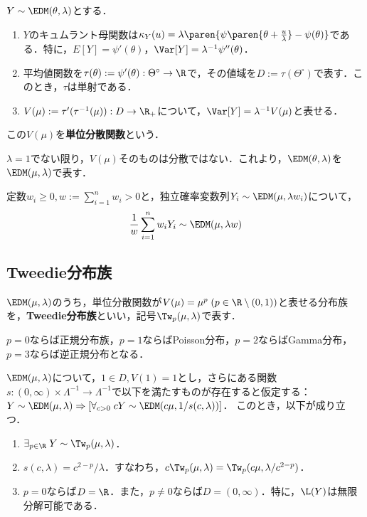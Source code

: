 \documentclass[uplatex,dvipdfmx]{jsreport}
\begin{document}
\begin{lemma}
    $Y\sim\EDM(\theta,\lambda)$とする．
    \begin{enumerate}
        \item $Y$のキュムラント母関数は$\kappa_Y(u)=\lambda\paren{\psi\paren{\theta+\frac{u}{\lambda}}-\psi(\theta)}$である．特に，$E[Y]=\psi'(\theta)$，$\Var[Y]=\lambda^{-1}\psi''(\theta)$．
        \item 平均値関数を$\tau(\theta):=\psi'(\theta):\Theta^\circ\to\R$で，その値域を$D:=\tau(\Theta^\circ)$で表す．このとき，$\tau$は単射である．
        \item $V(\mu):=\tau'(\tau^{-1}(\mu)):D\to\R_+$について，$\Var[Y]=\lambda^{-1}V(\mu)$と表せる．
    \end{enumerate}
    この$V(\mu)$を\textbf{単位分散関数}という．
\end{lemma}
\begin{remark}
    $\lambda=1$でない限り，$V(\mu)$そのものは分散ではない．これより，$\EDM(\theta,\lambda)$を$\EDM(\mu,\lambda)$で表す．
\end{remark}

\begin{lemma}
    定数$w_i\ge0,w:=\sum^n_{i=1}w_i>0$と，独立確率変数列$Y_i\sim\EDM(\mu,\lambda w_i)$について，
    \[\frac{1}{w}\sum^n_{i=1}w_iY_i\sim\EDM(\mu,\lambda w)\]
\end{lemma}

\subsection{Tweedie分布族}

\begin{definition}
    $\EDM(\mu,\lambda)$のうち，単位分散関数が$V(\mu)=\mu^p\;(p\in\R\setminus(0,1))$と表せる分布族を，\textbf{Tweedie分布族}といい，記号$\Tw_p(\mu,\lambda)$で表す．
\end{definition}
\begin{example}
    $p=0$ならば正規分布族，$p=1$ならばPoisson分布，$p=2$ならばGamma分布，$p=3$ならば逆正規分布となる．
\end{example}

\begin{proposition}
    $\EDM(\mu,\lambda)$について，$1\in D,V(1)=1$とし，さらにある関数$s:(0,\infty)\times\Lambda^{-1}\to\Lambda^{-1}$で以下を満たすものが存在すると仮定する：$Y\sim\EDM(\mu,\lambda)\Rightarrow[\forall_{c>0}\;cY\sim\EDM(c\mu,1/s(c,\lambda))]$．
    このとき，以下が成り立つ．
    \begin{enumerate}
        \item $\exists_{p\in\R}\;Y\sim\Tw_p(\mu,\lambda)$．
        \item $s(c,\lambda)=c^{2-p}/\lambda$．すなわち，$c\Tw_p(\mu,\lambda)=\Tw_p(c\mu,\lambda/c^{2-p})$．
        \item $p=0$ならば$D=\R$．また，$p\ne0$ならば$D=(0,\infty)$．特に，$\L(Y)$は無限分解可能である．
    \end{enumerate}
\end{proposition}
\end{document}
